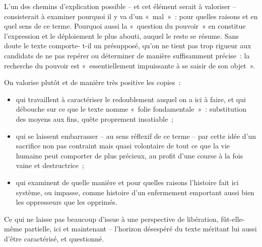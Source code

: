 {L'un des chemins d'explication possible – et cet élément serait à valoriser – consisterait
à examiner pourquoi il y va d'un «~mal~»~: pour quelles raisons et en quel sens de ce
terme. Pourquoi aussi la «~question du pouvoir~» en constitue l'expression et le
déploiement le plus abouti, auquel le reste se résume. Sans doute le texte comporte-
t-il un présupposé, qu'on ne tient pas trop rigueur aux candidats de ne pas repérer ou
déterminer de manière suffisamment précise~: la recherche du pouvoir est
«~essentiellement impuissante à se saisir de son objet~».

On valorise plutôt et de manière très positive les copies~:

\begin{itemize}
\item qui travaillent à caractériser le redoublement auquel on a ici à faire, et qui
débouche sur ce que le texte nomme «~folie fondamentale~»~: substitution des
moyens aux fins, quête proprement insatiable~;
\item qui se laissent embarrasser – au sens réflexif de ce terme – par cette idée d'un
sacrifice non pas contraint mais quasi volontaire de tout ce que la vie humaine
peut comporter de plus précieux, au profit d'une course à la fois vaine et
destructrice~;
\item qui examinent de quelle manière et pour quelles raisons l'histoire fait ici
système, ou impasse, comme histoire d'un enfermement emportant aussi bien
les oppresseurs que les opprimés.
\end{itemize}

Ce qui ne laisse pas beaucoup d'issue à une perspective de libération, fût-elle-même
partielle, ici et maintenant – l'horizon désespéré du texte méritant lui aussi d'être
caractérisé, et questionné.}%
